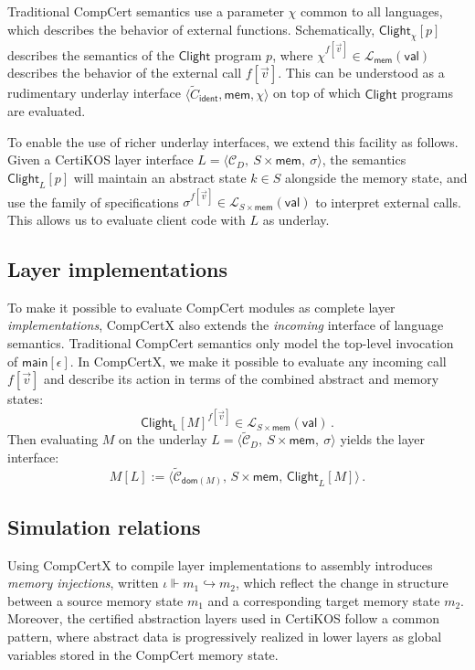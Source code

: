 \documentclass[11pt,oneside]{book}
\theoremstyle{definition}
\newcommand{\kw}[1]{\ensuremath{ \mathsf{#1} }}
\begin{document}
Traditional CompCert semantics use a parameter
$\chi$
common to all languages,
which describes the behavior of external functions.
Schematically,
$\kw{Clight}_\chi[p]$
describes the semantics of the \kw{Clight} program $p$,
where
$\chi^{f[\vec{v}]} \in
 \mathcal{L}_\kw{mem}(\kw{val})$
describes the behavior of
the external call $f[\vec{v}]$.
This can be understood as a rudimentary underlay interface
$\langle \tilde{C}_\kw{ident}, \kw{mem}, \chi \rangle$
on top of which \kw{Clight} programs
are evaluated.

To enable the use of richer underlay interfaces,
we extend this facility as follows.
Given a CertiKOS layer interface
$L = \langle \mathcal{C}_D, \: S \times \kw{mem}, \: \sigma \rangle$,
the semantics $\kw{Clight}_L[p]$
will maintain an abstract state $k \in S$
alongside the memory state,
and use the family of specifications
$\sigma^{f[\vec{v}]} \in \mathcal{L}_{S \times \kw{mem}}(\kw{val})$
to interpret external calls.
This allows us to evaluate client code
with $L$ as underlay.


\subsection{Layer implementations} %

To make it possible to evaluate CompCert modules
as complete layer \emph{implementations},
CompCertX also extends the \emph{incoming} interface
of language semantics.
Traditional CompCert semantics only model the top-level
invocation of $\kw{main}[\epsilon]$.
In CompCertX,
we make it possible to evaluate
any incoming call $f[\vec{v}]$
and describe its action in terms of
the combined abstract and memory states:
\[
  \kw{Clight_L}[M]^{f[\vec{v}]} \in
    \mathcal{L}_{S \times \kw{mem}}(\kw{val})
  \,.
\]
Then evaluating $M$ on the underlay
$L =
 \langle \tilde{\mathcal{C}}_D, \: S \times \kw{mem}, \: \sigma \rangle$
yields the layer interface:
\[
  M[L] :=
    \langle
      \tilde{\mathcal{C}}_{\kw{dom}(M)}, \,
      S \times \kw{mem}, \,
      \kw{Clight}_L[M]
    \rangle
  \,.
\]


\subsection{Simulation relations} %

Using CompCertX to compile layer implementations
to assembly
introduces \emph{memory injections},
written $\iota \Vdash m_1 \hookrightarrow m_2$,
which reflect the change in structure
between a source memory state $m_1$
and a corresponding target memory state $m_2$.
Moreover,
the certified abstraction layers used in CertiKOS
follow a common pattern,
where abstract data is progressively
realized in lower layers
as global variables stored in the CompCert memory state.
\end{document}
